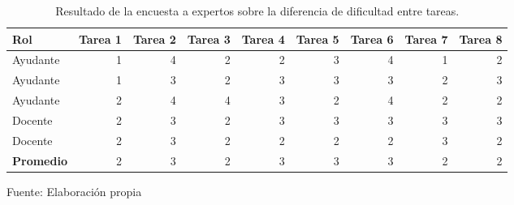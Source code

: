 \documentclass[letterpaper,12pt]{article}
\begin{document}
\begin{table}[H]
  \centering
  \begin{tabular}{|l|r|r|r|r|r|r|r|r|}
    \hline
    \textbf{Rol}      & \multicolumn{1}{l|}{\textbf{Tarea 1}} & \multicolumn{1}{l|}{\textbf{Tarea 2}} & \multicolumn{1}{l|}{\textbf{Tarea 3}} & \multicolumn{1}{l|}{\textbf{Tarea 4}} & \multicolumn{1}{l|}{\textbf{Tarea 5}} & \multicolumn{1}{l|}{\textbf{Tarea 6}} & \multicolumn{1}{l|}{\textbf{Tarea 7}} & \multicolumn{1}{l|}{\textbf{Tarea 8}} \\ \hline
    Ayudante          & 1                                     & 4                                     & 2                                     & 2                                     & 3                                     & 4                                     & 1                                     & 2                                     \\ \hline
    Ayudante          & 1                                     & 3                                     & 2                                     & 3                                     & 3                                     & 3                                     & 2                                     & 3                                     \\ \hline
    Ayudante          & 2                                     & 4                                     & 4                                     & 3                                     & 2                                     & 4                                     & 2                                     & 2                                     \\ \hline
    Docente           & 2                                     & 3                                     & 2                                     & 3                                     & 3                                     & 3                                     & 3                                     & 3                                     \\ \hline
    Docente           & 2                                     & 3                                     & 2                                     & 2                                     & 2                                     & 2                                     & 3                                     & 2                                     \\ \hline
    \rowcolor[HTML]{EFEFEF}
    \textbf{Promedio} & 2                                     & 3                                     & 2                                     & 3                                     & 3                                     & 3                                     & 2                                     & 2                                     \\ \hline
  \end{tabular}
  \caption{Resultado de la encuesta a expertos sobre la diferencia de dificultad entre tareas. }Fuente: Elaboración propia
  \label{tab:encuesta1}
\end{table}
\end{document}
